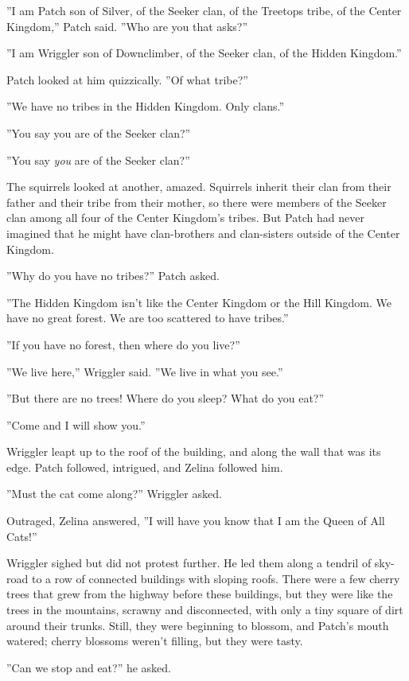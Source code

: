 \documentclass[12pt]{book}
\begin{document}
''I am Patch son of Silver, of the Seeker clan, of the Treetops tribe,
of the Center Kingdom,'' Patch said. ''Who are you that asks?''

''I am Wriggler son of Downclimber, of the Seeker clan, of the Hidden
Kingdom.''

Patch looked at him quizzically. ''Of what tribe?''

''We have no tribes in the Hidden Kingdom. Only clans.''

''You say you are of the Seeker clan?''

''You say \textit{you} are of the Seeker clan?''

The squirrels looked at another, amazed. Squirrels inherit their clan
from their father and their tribe from their mother, so there were
members of the Seeker clan among all four of the Center Kingdom's
tribes. But Patch had never imagined that he might have clan-brothers
and clan-sisters outside of the Center Kingdom.

''Why do you have no tribes?'' Patch asked.

''The Hidden Kingdom isn't like the Center Kingdom or the Hill
Kingdom. We have no great forest. We are too scattered to have
tribes.''

''If you have no forest, then where do you live?''

''We live here,'' Wriggler said. ''We live in what you see.''

''But there are no trees! Where do you sleep? What do you eat?''

''Come and I will show you.''

Wriggler leapt up to the roof of the building, and along the wall that
was its edge. Patch followed, intrigued, and Zelina followed him.

''Must the cat come along?'' Wriggler asked.

Outraged, Zelina answered, ''I will have you know that I am the Queen
of All Cats!''

Wriggler sighed but did not protest further. He led them along a
tendril of sky-road to a row of connected buildings with sloping
roofs. There were a few cherry trees that grew from the highway before
these buildings, but they were like the trees in the mountains,
scrawny and disconnected, with only a tiny square of dirt around their
trunks. Still, they were beginning to blossom, and Patch's mouth
watered; cherry blossoms weren't filling, but they were tasty.

''Can we stop and eat?'' he asked.
\end{document}
